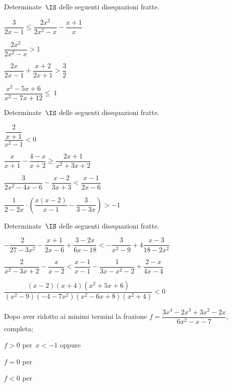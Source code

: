 \begin{esercizio}[\Ast]
\label{ese:21.62}
Determinate~$\IS$ delle seguenti disequazioni fratte.
\begin{multicols}{2}
\begin{enumeratea}
\spazielenx
 \item $\dfrac{3}{2x-1}\le \dfrac{2x^{2}}{2x^{2}-x}-\dfrac{x+1}{x}$
\item $\dfrac{2x^{2}}{2x^{2}-x}>1$
\item $\dfrac{2x}{2x-1}+\dfrac{x+2}{2x+1}>\dfrac{3}{2}$
\item $\dfrac{x^{2}-5x+6}{x^{2}-7x+12}\le~1$
\end{enumeratea}
\end{multicols}
\end{esercizio}

\begin{esercizio}[\Ast]
\label{ese:21.63}
Determinate~$\IS$ delle seguenti disequazioni fratte.
\begin{multicols}{2}
\begin{enumeratea}
\spazielenx
 \item $\dfrac{\dfrac{2}{x+1}}{x^{2}-1}<0$
\item $\dfrac{x}{x+1}-\dfrac{4-x}{x+2}\ge \dfrac{2x+1}{x^{2}+3x+2}$
\item $\dfrac{3}{2x^{2}-4x-6}-\dfrac{x-2}{3x+3}<\dfrac{x-1}{2x-6}$
\item $\dfrac{1}{2-2x}\cdot \left(\dfrac{x(x-2)}{x-1}-\dfrac{3}{3-3x}\right)>-1$
\end{enumeratea}
\end{multicols}
\end{esercizio}

\begin{esercizio}[\Ast]
\label{ese:21.64}
Determinate~$\IS$ delle seguenti disequazioni fratte.

\begin{enumeratea}
 \item $-{\dfrac{2}{27-3x^{2}}}-\dfrac{x+1}{2x-6}+\dfrac{3-2x}{6x-18}<-{\dfrac{3}{x^{2}-9}}+4\dfrac{x-3}{18-2x^{2}}$
\item $\dfrac{2}{x^{2}-3x+2}-\dfrac{x}{x-2}<\dfrac{x-1}{x-1}-\dfrac{1}{3x-x^{2}-2}+\dfrac{2-x}{4x-4}$
\item $\dfrac{(x-2)(x+4)(x^{2}+5x+6)}{(x^{2}-9)(-4-7x^{2})(x^{2}-6x+8)(x^{2}+4)}<0$
\end{enumeratea}
\end{esercizio}

\begin{esercizio}
\label{ese:21.65}
Dopo aver ridotto ai minimi termini la frazione
$f=\dfrac{3x^{4}-2x^{3}+3x^{2}-2x}{6x^{2}-x-7}$, completa;

 \begin{enumeratea}
 \item $f>0$ per~$x<-1$ oppure \dotfill
 \item $f=0$ per \dotfill
 \item $f<0$ per \dotfill
 \end{enumeratea}
\end{esercizio}

